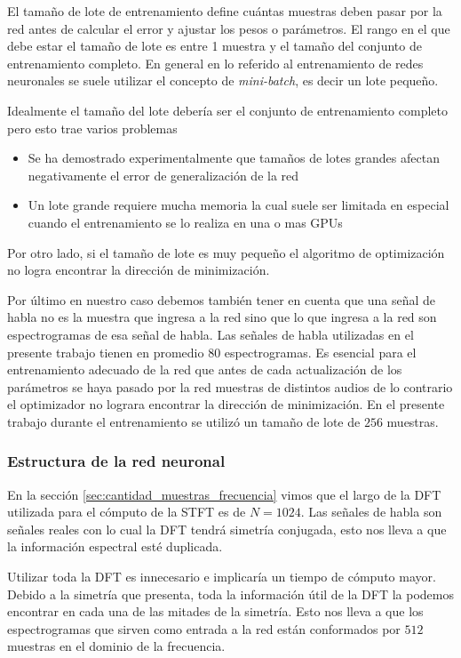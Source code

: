 El tamaño de lote de entrenamiento define cuántas muestras deben pasar por la red antes de calcular el error y ajustar los pesos o parámetros. El rango en el que debe estar el tamaño de lote es entre 1 muestra y el tamaño del conjunto de entrenamiento completo. En general en lo referido al entrenamiento de redes neuronales se suele utilizar el concepto de \emph{mini-batch}, es decir un lote pequeño. 

Idealmente el tamaño del lote debería ser el conjunto de entrenamiento completo pero esto trae varios problemas

\begin{itemize}
	\item Se ha demostrado experimentalmente que tamaños de lotes grandes afectan negativamente el error de generalización de la red \cite{on_large_batch_training} 
	\item Un lote grande requiere mucha memoria la cual suele ser limitada en especial cuando el entrenamiento se lo realiza en una o mas GPUs
\end{itemize}

Por otro lado, si el tamaño de lote es muy pequeño el algoritmo de optimización no logra encontrar la dirección de minimización. 

Por último en nuestro caso debemos también tener en cuenta que una señal de habla no es la muestra que ingresa a la red sino que lo que ingresa a la red son espectrogramas de esa señal de habla. Las señales de habla utilizadas en el presente trabajo tienen en promedio 80 espectrogramas. Es esencial para el entrenamiento adecuado de la red que antes de cada actualización de los parámetros se haya pasado por la red muestras de distintos audios de lo contrario el optimizador no lograra encontrar la dirección de minimización. En el presente trabajo durante el entrenamiento se utilizó un tamaño de lote de $256$ muestras.

\subsubsection{Estructura de la red neuronal}

En la sección \ref{sec:cantidad_muestras_frecuencia} vimos que el largo de la DFT utilizada para el cómputo de la STFT es de $N=1024$. Las señales de habla son señales reales con lo cual la DFT tendrá simetría conjugada, esto nos lleva a que la información espectral esté duplicada.

Utilizar toda la DFT es innecesario e implicaría un tiempo de cómputo mayor. Debido a la simetría que presenta, toda la información útil de la DFT la podemos encontrar en cada una de las mitades de la simetría. Esto nos lleva a que los espectrogramas que sirven como entrada a la red están conformados por $512$ muestras en el dominio de la frecuencia.

